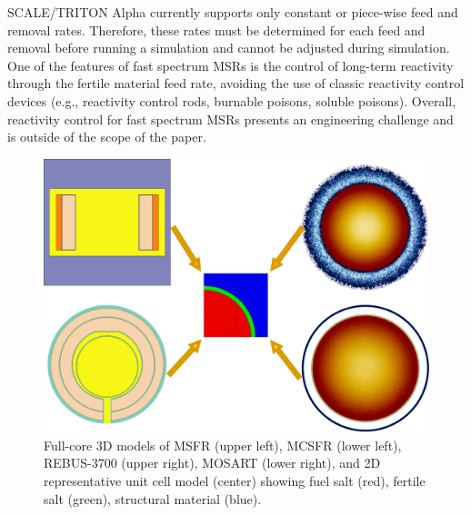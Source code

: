 \documentclass[letterpaper]{mandc2019}
\begin{document}
SCALE/TRITON Alpha currently supports only constant or piece-wise feed and removal rates. Therefore, these rates must be determined for each feed and removal before running a simulation and cannot be adjusted during simulation. One of the features of fast spectrum \gls{MSR}s is the control of long-term reactivity through the fertile material feed rate, avoiding the use of classic reactivity control devices (e.g., reactivity control rods, burnable poisons, soluble poisons). Overall, reactivity control for fast spectrum \gls{MSR}s presents an engineering challenge and is outside of the scope of the paper.
\begin{figure}[!htb]
  \centering
  \includegraphics[scale=0.265]{./Figures/fsmsrs.pdf}
  \caption{Full-core 3D models of \gls{MSFR} (upper left), \gls{MCSFR} (lower left), REBUS-3700 (upper right), \gls{MOSART} (lower right), and 2D representative unit cell model (center) showing fuel salt (red), fertile salt (green), structural material (blue).}
  \vspace{-0.15in}
  \label{fig:unit_cell}
\end{figure}
\end{document}
